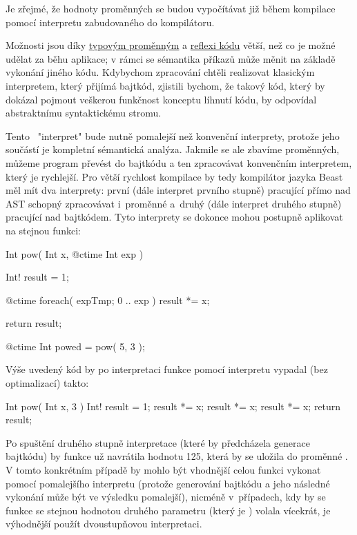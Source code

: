 Je zřejmé, že hodnoty \ctime proměnných se budou vypočítávat již během kompilace pomocí interpretu zabudovaného do kompilátoru.

Možnosti \ctime jsou díky \hyperref[ctime:typeVars]{typovým proměnným} a \hyperref[ctime:reflection]{reflexi kódu} větší, než co je možné udělat za běhu aplikace; v rámci \ctime se sémantika příkazů může měnit na základě vykonání jiného \ctime kódu. Kdybychom zpracování \ctime chtěli realizovat klasickým interpretem, který přijímá bajtkód, zjistili bychom, že takový kód, který by dokázal pojmout veškerou funkčnost konceptu líhnutí kódu, by odpovídal abstraktnímu syntaktickému stromu.

Tento \ctime~"interpret" bude nutně pomalejší než konvenční interprety, protože jeho součástí je kompletní sémantická analýza. Jakmile se ale zbavíme \ctime proměnných, můžeme program převést do bajtkódu a ten zpracovávat konvenčním interpretem, který je rychlejší. Pro větší rychlost kompilace by tedy kompilátor jazyka Beast měl mít dva interprety: první (dále interpret prvního stupně) pracující přímo nad AST schopný zpracovávat i~\ctime proměnné a~druhý (dále interpret druhého stupně) pracující nad bajtkódem. Tyto interprety se dokonce mohou postupně aplikovat na stejnou funkci:

\begin{code}
Int pow( Int x, @ctime Int exp ) {
	Int! result = 1;
	
	@ctime foreach( expTmp; 0 .. exp )
		result *= x;
		
	return result;
}

@ctime Int powed = pow( 5, 3 );
\end{code}

Výše uvedený kód by po interpretaci funkce  pomocí \ctime interpretu vypadal (bez optimalizací) takto:

\begin{code}
Int pow( Int x, 3 ) {
	Int! result = 1;
	result *= x;
	result *= x;
	result *= x;
	return result;
}
\end{code}

Po spuštění druhého stupně interpretace (které by předcházela generace bajtkódu) by funkce už navrátila hodnotu 125, která by se uložila do proměnné . V tomto konkrétním případě by mohlo být vhodnější celou funkci vykonat pomocí pomalejšího \ctime interpretu (protože generování bajtkódu a jeho následné vykonání může být ve výsledku pomalejší), nicméně v~případech, kdy by se funkce  se stejnou hodnotou druhého parametru (který je \ctime) volala vícekrát, je výhodnější použít dvoustupňovou interpretaci.

